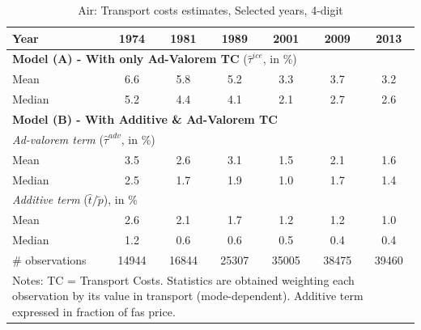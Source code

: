 \documentclass[a4paper,11pt]{article}
\begin{document}
\begin{table}[htbp]
  \centering
  \caption{Air: Transport costs estimates, Selected years, 4-digit}
\begin{center}
    \begin{tabular}{l|cccccc}
   \hline\hline
Year & 1974  & 1981  & 1989  & 2001  & 2009  & 2013 \\ \hline
\multicolumn{7}{l}{\textbf{Model (A) - With only Ad-Valorem TC} ($\widehat{\tau}^{ice}$, in \%) }  \\
\hline
Mean  & 6.6 & 5.8 & 5.2 & 3.3 & 3.7 & 3.2 \\
Median & 5.2 & 4.4 & 4.1 & 2.1 & 2.7 & 2.6 \\
\hline
\multicolumn{7}{l}{\textbf{Model (B) - With Additive \& Ad-Valorem TC}}  \\ \hline
\multicolumn{7}{l}{\textit{Ad-valorem term }($\widehat{\tau}^{adv}$, in \%) }   \\ \hline
Mean  & 3.5 & 2.6 & 3.1 & 1.5 & 2.1 & 1.6  \\
Median & 2.5 & 1.7 & 1.9 & 1.0 & 1.7 & 1.4  \\
\hline
\multicolumn{7}{l}{\textit{Additive term} ($\widehat{t}/\widetilde{p}$), in \%}    \\ \hline
Mean  & 2.6 & 2.1 & 1.7 & 1.2 &1.2 & 1.0 \\
Median & 1.2 & 0.6 & 0.6 & 0.5 & 0.4 & 0.4  \\
\hline
\# observations & 14944 & 16844 & 25307 & \multicolumn{1}{c}{35005} & \multicolumn{1}{c}{38475} & \multicolumn{1}{c}{39460}  \\
\hline\hline
\multicolumn{7}{l}{\parbox[l]{11cm}{ \vspace{7pt}\scriptsize{Notes: TC = Transport Costs. Statistics are obtained weighting each observation by its value in transport (mode-dependent). Additive term expressed in fraction of fas price.}}}
\end{tabular}%
\end{center}
  \label{tab:result_air_rob}
\end{table}%
\end{document}
